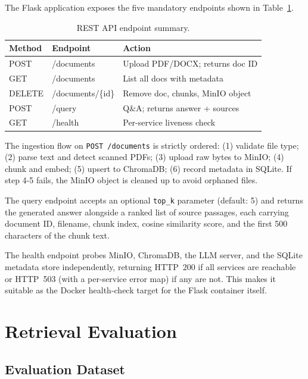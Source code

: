 \documentclass[10pt]{article}
\begin{document}
The Flask application exposes the five mandatory endpoints shown in
Table~\ref{tab:api}.

\begin{table}[h]
\centering

\small
\begin{tabular}{@{}lll@{}}
\toprule
\textbf{Method} & \textbf{Endpoint} & \textbf{Action} \\
\midrule
POST   & /documents        & Upload PDF/DOCX; returns doc ID \\
GET    & /documents        & List all docs with metadata \\
DELETE & /documents/\{id\} & Remove doc, chunks, MinIO object \\
POST   & /query            & Q\&A; returns answer + sources \\
GET    & /health           & Per-service liveness check \\
\bottomrule
\end{tabular}
\caption{REST API endpoint summary.}
\label{tab:api}
\end{table}

The ingestion flow on \texttt{POST /documents} is strictly ordered:
(1) validate file type; (2) parse text and detect scanned PDFs;
(3) upload raw bytes to MinIO; (4) chunk and embed; (5) upsert to ChromaDB;
(6) record metadata in SQLite.
If step 4-5 fails, the MinIO object is cleaned up to avoid orphaned files.

The query endpoint accepts an optional \texttt{top\_k} parameter
(default: 5) and returns the generated answer alongside a ranked list of
source passages, each carrying document ID, filename, chunk index, cosine
similarity score, and the first 500 characters of the chunk text.

The health endpoint probes MinIO, ChromaDB, the LLM server, and
the SQLite metadata store independently, returning HTTP~200 if all services
are reachable or HTTP~503 (with a per-service error map) if any are not.
This makes it suitable as the Docker health-check target for the Flask
container itself.

\section{Retrieval Evaluation}

\subsection{Evaluation Dataset}
\end{document}
